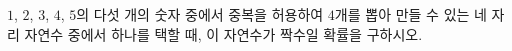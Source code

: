 $1$, $2$, $3$, $4$, $5$의 다섯 개의 숫자 중에서 중복을 허용하여 $4$개를 뽑아 만들 수 있는 네 자리 자연수 중에서 하나를 택할 때, 이 자연수가 짝수일 확률을 구하시오.
